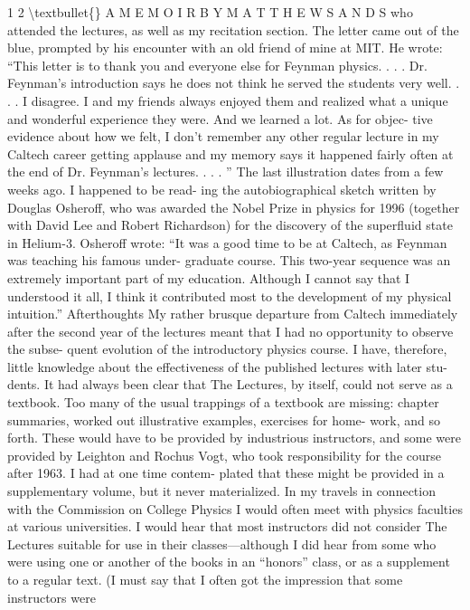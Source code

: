 \documentclass[10pt,oneside]{article}
\begin{document}
1 2 \textbackslash{}textbullet\{\} A  M E M O I R  B Y  M A T T H E W  S A N D S who attended the lectures, as well as my recitation section. The letter came out of the blue, prompted by his encounter with an old friend of mine at MIT. He wrote: “This letter is to thank you and everyone else for Feynman physics. . . . Dr. Feynman’s introduction says he does not think he served the students very well. . . . I disagree. I and my friends always enjoyed them and realized what a unique and wonderful experience they were. And we learned a lot. As for objec- tive evidence about how we felt, I don’t remember any other regular lecture in my Caltech career getting applause and my memory says it happened fairly often at the end of Dr. Feynman’s lectures. . . . ” The last illustration dates from a few weeks ago. I happened to be read- ing the autobiographical sketch written by Douglas Osheroff, who was awarded the Nobel Prize in physics for 1996 (together with David Lee and Robert Richardson) for the discovery of the superfluid state in Helium-3. Osheroff wrote: “It was a good time to be at Caltech, as Feynman was teaching his famous under- graduate course. This two-year sequence was an extremely important part of my education. Although I cannot say that I understood it all, I think it contributed most to the development of my physical intuition.” Afterthoughts My rather brusque departure from Caltech immediately after the second year of the lectures meant that I had no opportunity to observe the subse- quent evolution of the introductory physics course. I have, therefore, little knowledge about the effectiveness of the published lectures with later stu- dents. It had always been clear that The Lectures, by itself, could not serve as a textbook. Too many of the usual trappings of a textbook are missing: chapter summaries, worked out illustrative examples, exercises for home- work, and so forth. These would have to be provided by industrious instructors, and some were provided by Leighton and Rochus Vogt, who took responsibility for the course after 1963. I had at one time contem- plated that these might be provided in a supplementary volume, but it never materialized. In my travels in connection with the Commission on College Physics I would often meet with physics faculties at various universities. I would hear that most instructors did not consider The Lectures suitable for use in their classes---although I did hear from some who were using one or another of the books in an “honors” class, or as a supplement to a regular text. (I must say that I often got the impression that some instructors were\par
\end{document}
